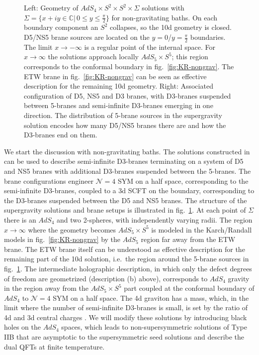 \documentclass[aps,prd,11pt,notitlepage,longbibliography,nofootinbib,tightenlines,preprintnumbers]{revtex4-1}
\begin{document}
\begin{figure}
	
\caption{
	Left: Geometry of $AdS_4\times S^2\times S^2\times\Sigma$ solutions with $\Sigma=\lbrace x+iy\in\mathds{C}\vert \,0\leq y\leq \frac{\pi}{2}\rbrace$ for non-gravitating baths. On each boundary component an $S^2$ collapses, so the 10d geometry is closed.
	D5/NS5 brane sources are located on the $y=0$/$y=\frac{\pi}{2}$ boundaries.
	The limit $x\rightarrow -\infty$ is a regular point of the internal space.
	For $x\rightarrow\infty$ the solutions approach locally $AdS_5\times S^5$; this region corresponds to the conformal boundary in fig.~\ref{fig:KR-nongrav}.
	The ETW brane in fig.~\ref{fig:KR-nongrav} can be seen as effective description for the remaining 10d geometry.
	Right: Associated configuration of D5, NS5 and D3 branes, with D3-branes suspended between 5-branes and semi-infinite D3-branes emerging in one direction. The distribution of 5-brane sources in the supergravity solution encodes how many D5/NS5 branes there are and how the D3-branes  end on them.
	\label{fig:AdS4-sol}}
\end{figure}



We start the discussion with non-gravitating baths.
The solutions constructed in \cite{DHoker:2007zhm,DHoker:2007hhe,Aharony:2011yc} can be used to describe semi-infinite D3-branes terminating on a system of D5 and NS5 branes with additional D3-branes suspended between the 5-branes.
The brane configurations engineer $\mathcal N=4$ SYM on a half space, corresponding to the semi-infinite D3-branes, coupled to a 3d SCFT on the boundary, corresponding to the D3-branes suspended between the D5 and NS5 branes. 
The structure of the supergravity solutions and brane setups is illustrated in fig.~\ref{fig:AdS4-sol}.
At each point of $\Sigma$ there is an $AdS_4$ and two 2-spheres, with independently varying radii.
%
The region $x\rightarrow\infty$ where the geometry becomes $AdS_5\times S^5$ is modeled in the Karch/Randall models in fig.~\ref{fig:KR-nongrav} by the $AdS_5$ region far away from the ETW brane.
The ETW brane itself can be understood as effective description for the remaining part of the 10d solution, i.e.\ the region around the 5-brane sources in fig.~\ref{fig:AdS4-sol}.
The intermediate holographic description, in which only the defect degrees of freedom are geometrized (description (b) above), corresponds to $AdS_4$ gravity in the region away from the $AdS_5\times S^5$ part coupled at the conformal boundary of $AdS_4$ to $\mathcal N=4$ SYM on a half space.
The 4d graviton has a mass, which, in the limit where the number of semi-infinite D3-branes is small, is set by the ratio of 4d and 3d central charges \cite{Bachas:2018zmb}.
We will modify these solutions by introducing black holes on the $AdS_4$ spaces, which leads to non-supersymmetric solutions of Type IIB that are asymptotic to the supersymmetric seed solutions and describe the dual QFTs at finite temperature.
\end{document}
